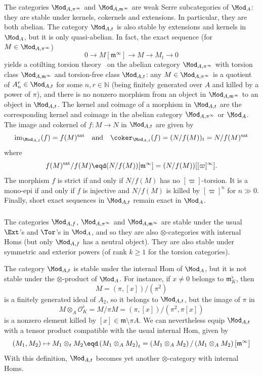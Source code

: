 The categories $\Mod_{A,\pi^{\infty}}$ and $\Mod_{A,\mathfrak{m}^{\infty}}$ are weak Serre subcategories of $\Mod_{A}$: they are stable under kernels, cokernels and extensions. In particular, they are both abelian. The category $\Mod_{A,t}$ is also stable by extensions and kernels in $\Mod_{A}$, but it is only quasi-abelian. In fact, the exact sequence (for $M\in\Mod_{A,\pi^{\infty}}$)
\[
0\rightarrow M[\mathfrak{m}^{\infty}]\rightarrow M\rightarrow M_{t}\rightarrow0
\]
yields a cotilting torsion theory~\cite{BoVdB03} on the abelian category $\Mod_{A,\pi^{\infty}}$ with torsion class $\Mod_{A,\mathfrak{m}^{\infty}}$ and torsion-free class $\Mod_{A,t}$: any $M\in\Mod_{A,\pi^{\infty}}$ is a quotient of $A_{n}^{r}\in\Mod_{A,t}$ for some $n,r\in\mathbb{N}$ (being finitely generated over $A$ and killed by a power of $\pi$), and there is no nonzero morphism from an object in $\Mod_{A,\mathfrak{m}^{\infty}}$ to an object in $\Mod_{A,t}$. The kernel and coimage of a morphism in $\Mod_{A,t}$ are the corresponding kernel and coimage in the abelian category $\Mod_{A,\pi^{\infty}}$ or $\Mod_{A}$. The image and cokernel of $f:M\rightarrow N$ in $\Mod_{A,t}$ are given by
\[
\mathrm{im}_{\Mod_{A,t}}(f)=f(M)^{\mathrm{sat}}\quad\text{and}\quad\coker_{\Mod_{A,t}}(f)=(N/f(M))_{t}=N/f(M)^{\mathrm{sat}}
\]
where
\[
f(M)^{\mathrm{sat}}/f(M)\eqd(N/f(M))[\mathfrak{m}^{\infty}]=(N/f(M))[[\varpi]^{\infty}].
\]
The morphism $f$ is strict if and only if $N/f(M)$ has no $[\varpi]$-torsion. It is a mono-epi if and only if $f$ is injective and $N/f(M)$ is killed by $[\varpi]^{n}$ for $n\gg0$. Finally, short exact sequences in $\Mod_{A,t}$ remain exact in $\Mod_{A}$.

\subsubsection{}

The categories $\Mod_{A,f}$, $\Mod_{A,\pi^{\infty}}$ and $\Mod_{A,\mathfrak{m}^{\infty}}$ are stable under the usual $\Ext$'s and $\Tor$'s in $\Mod_{A}$, and so they are also $\otimes$-categories with internal Homs (but only $\Mod_{A,f}$ has a neutral object). They are also stable under symmetric and exterior powers (of rank $k\geq1$ for the torsion categories).

The category $\Mod_{A,t}$ is stable under the internal Hom of $\Mod_{A}$, but it is not stable under the $\otimes$-product of $\Mod_{A}$. For instance, if $x\neq0$ belongs to $\mathfrak{m}_{K}^{\flat}$, then
\[
M=(\pi,[x])/(\pi^{2})
\]
is a finitely generated ideal of $A_{2}$, so it belongs to $\Mod_{A,t}$, but the image of $\pi$ in
\[
M\otimes_{A}\mathcal{O}_{K}^{\flat}=M/\pi M=(\pi,[x])/(\pi^{2},\pi[x])
\]
is a nonzero element killed by $[x]\in\mathfrak{m}\setminus\pi A$. We can nevertheless equip $\Mod_{A,t}$ with a tensor product compatible with the usual internal Hom, given by
\[
(M_{1},M_{2})\mapsto M_{1}\otimes_{t}M_{2}\eqd\left(M_{1}\otimes_{A}M_{2}\right)_{t}=\left(M_{1}\otimes_{A}M_{2}\right)/\left(M_{1}\otimes_{A}M_{2}\right)[\mathfrak{m}^{\infty}]
\]
With this definition, $\Mod_{A,t}$ becomes yet another $\otimes$-category with internal Homs.

